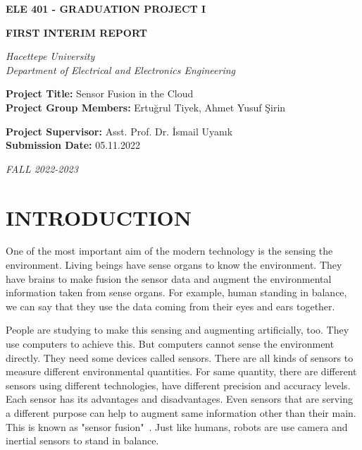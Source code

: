 \documentclass[12pt]{article}
\begin{document}
\begin{titlepage}
    \begin{center}
        \LARGE
        \textbf{ELE 401 - GRADUATION PROJECT I}

        \Large
        \textbf{FIRST INTERIM REPORT}

        \vspace{70pt}

        \textit{
            Hacettepe University \\
            Department of Electrical and Electronics Engineering
        }
    \end{center}
    
    \vspace{90pt}

    \large

    \textbf{Project Title:} Sensor Fusion in the Cloud \\

    \textbf{Project Group Members:} Ertuğrul Tiyek, Ahmet Yusuf Şirin

    \vspace{30pt}

    \textbf{Project Supervisor:} Asst. Prof. Dr. İsmail Uyanık \\

    \textbf{Submission Date:} 05.11.2022

    \vspace{\fill}

    \begin{center}
        \textit{FALL 2022-2023}
    \end{center}
\end{titlepage}

\clearpage

\tableofcontents
\listoffigures
\listoftables

\clearpage

\section{INTRODUCTION}

One of the most important aim of the modern technology is the sensing the environment. Living beings have sense organs to know the environment. They have brains to make fusion the sensor data and augment the environmental information taken from sense organs. For example, human standing in balance, we can say that they use the data coming from their eyes and ears together.

People are studying to make this sensing and augmenting artificially, too. They use computers to achieve this. But computers cannot sense the environment directly. They need some devices called sensors. There are all kinds of sensors to measure different environmental quantities. For same quantity, there are different sensors using different technologies, have different precision and accuracy levels. Each sensor has its advantages and disadvantages. Even sensors that are serving a different purpose can help to augment same information other than their main. This is known as "sensor fusion"~\cite{enwiki:1115352853}. Just like humans, robots are use camera and inertial sensors to stand in balance. 
\end{document}

